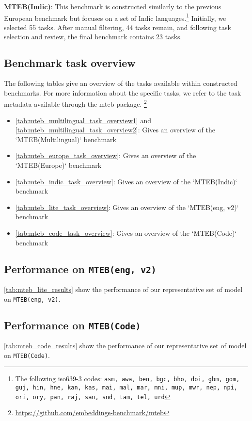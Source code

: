 \textbf{MTEB(Indic)}:
This benchmark is constructed similarly to the previous European benchmark but focuses on a set of Indic languages.\footnote{The following iso639-3 codes: \texttt{asm, awa, ben, bgc, bho, doi, gbm, gom, guj, hin, hne, kan, kas, mai, mal, mar, mni, mup, mwr, nep, npi, ori, ory, pan, raj, san, snd, tam, tel, urd}}
Initially, we selected 55 tasks. After manual filtering, 44 tasks remain, and following task selection and review, the final benchmark contains 23 tasks.

\subsection{Benchmark task overview}
\label{sec:appendix-benchmark-overview}

The following tables give an overview of the tasks available within constructed benchmarks. For more information about the specific tasks, we refer to the task metadata available through the mteb package. \footnote{\url{https://github.com/embeddings-benchmark/mteb}}

\begin{itemize}
    \item \autoref{tab:mteb_multilingual_task_overview1} and \autoref{tab:mteb_multilingual_task_overview2}: Gives an overview of the `MTEB(Multilingual)` benchmark
    \item \autoref{tab:mteb_europe_task_overview}: Gives an overview of the `MTEB(Europe)` benchmark
    \item \autoref{tab:mteb_indic_task_overview}: Gives an overview of the `MTEB(Indic)` benchmark
    \item \autoref{tab:mteb_lite_task_overview}: Gives an overview of the `MTEB(eng, v2)` benchmark
    \item \autoref{tab:mteb_code_task_overview}: Gives an overview of the `MTEB(Code)` benchmark
\end{itemize}







\subsection{Performance on \texttt{MTEB(eng, v2)}}
\label{sec:appendix-mteb-lite-perf}

\autoref{tab:mteb_lite_results} show the performance of our representative set of model on \texttt{MTEB(eng, v2)}.



\subsection{Performance on \texttt{MTEB(Code)}}
\label{sec:appendix-mteb-code-perf}

\autoref{tab:mteb_code_results} show the performance of our representative set of model on \texttt{MTEB(Code)}.

